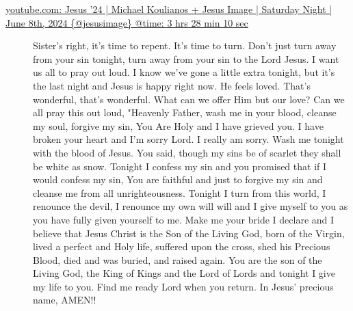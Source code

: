 \documentclass[11pt]{article}
\begin{document}
\begin{description}
\item[{\href{https://youtube.com/watch?v=mLSCu4pKmu4\&t=12490}{youtube.com: Jesus '24 | Michael Koulianos + Jesus Image | Saturday Night | June 8th, 2024 \{@jesusimage\} @time: 3 hrs 28 min 10 sec}}] Sister's right, it's time to repent.
It's time to
turn. Don't just turn away from your sin
tonight, turn away from your sin to the
Lord Jesus. I want us all to pray out loud. I
know we've gone a little extra tonight,
but it's the last night and Jesus is happy right now. He
feels loved. That's
wonderful, that's wonderful. What can we
offer Him but our
love? Can we all pray this out
loud, "Heavenly Father, wash me in your blood, cleanse my soul,
forgive my sin, You Are Holy and I have grieved you.
I have broken your heart and I'm sorry Lord.
I really am sorry. Wash me
tonight with the blood of Jesus. You
said, though my sins be of
scarlet they shall be white as snow.
Tonight I confess my sin and you
promised that if I would confess my
sin, You are faithful and
just to forgive my sin and cleanse
me from all unrighteousness. Tonight I turn from this
world, I renounce the devil, I renounce my own will
will and I give myself to you as you have fully
given yourself to
me. Make me your bride 
I declare and I believe that
Jesus Christ is the Son of
the Living God, born of the Virgin,
lived a perfect and Holy life,
suffered upon the cross,
shed his Precious Blood, died and was buried,
and raised again.
You are the son of the Living
God, the King of Kings and the Lord of
Lords and tonight I give my life to you. Find me
ready Lord
when you
return. In Jesus' precious
name, AMEN!!
\end{description}
\end{document}
